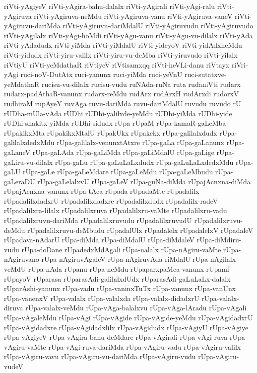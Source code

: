 {riVti-yAgiyeV
riVti-yAgira-bahu-dalalx
riVti-yAgirali
riVti-yAgi-ralu
riVti-yAgiruva
riVti-yAgiruva-neMdu
riVti-yAgiruva-vanu
riVti-yAgiruva-vaneV
riVti-yAgiruvu-dariMda
riVti-yAgiruvu-dariMdalU
riVti-yAgiruvudu
riVti-yAgiruvudo
riVti-yAgilalx
riVti-yAgi-hoMdi
riVti-yAgu-vanu
riVti-yAgu-vu-dilalx
riVti-yAda
riVti-yAdadudx
riVti-yiMda
riVti-yiMdalU
riVti-yideyoV
riVti-yidAdxneMdu
riVti-yidudx
riVti-yiru-valilx
riVti-yiru-vu-deMba
riVti-yiruvudo
riVti-yilalx
riVtiyU
riVti-yeMdathaR
riVtiyeV
riVtisamxqq
riVti-heVLi-danu
riVtayx
riVri-yAgi
ruci-noV-DutAtx
ruci-yanunx
ruci-yiMda
ruci-yeVnU
ruci-sutatxve-yeMdathaR
rucisu-vu-dilalx
rucisu-vudu
ruNAda-ruNa
ruta
rudaniVti
rudarx
rudarx-padAthaR-vanunx
rudarx-reMdu
rudArx
rudArxH
rudArxdi
rudorxV
rudhiraM
rupAyeY
ruvAga
ruvu-dariMda
ruvu-dariMdalU
ruvudu
ruvudo
rU
rUDha-mUla-vAda
rUDhi
rUDhi-yalilxde-yeMdu
rUDhi-yiMda
rUDhi-yide
rUDhi-shakitx-yiMda
rUDhi-sidudx
rUpa
rUpaM
rUpa-kamaR-gaLeMba
rUpakikxMta
rUpakikxMtalU
rUpakUkx
rUpakekx
rUpa-galilalxdudx
rUpa-galilalxdedxMdu
rUpa-galilalx-venunxtAtxre
rUpa-gaLa
rUpa-gaLanunx
rUpa-gaLaneV
rUpa-gaLAda
rUpa-gaLiMda
rUpa-gaLiMdalU
rUpa-gaLige
rUpa-gaLiru-vu-dilalx
rUpa-gaLu
rUpa-gaLuLaLxdudx
rUpa-gaLuLaLxdedxMdu
rUpa-gaLU
rUpa-gaLe
rUpa-gaLeMdare
rUpa-gaLeMdu
rUpa-gaLeMbudu
rUpa-gaLeraDU
rUpa-gaLelalxvU
rUpa-gaLeV
rUpa-guNa-diMda
rUpajAcnxna-diMda
rUpajAcnxna-vanunx
rUpa-tAca
rUpada
rUpadaMte
rUpadalilx
rUpadalilxdadxrU
rUpadalilxdadxre
rUpadalilxdudx
rUpadalilx-radeV
rUpadalilxra-lilalx
rUpadalilxruva
rUpadalilxru-vaMte
rUpadalilxru-vadu
rUpadalilxruvu-dariMda
rUpadalilxruvudu
rUpadalilxruvudU
rUpadalilxruvu-deMdu
rUpadalilxruvu-deMbudu
rUpadalUlx
rUpadalelx
rUpadalelxV
rUpadaleV
rUpadava-nAdarU
rUpa-diMda
rUpa-diMdalU
rUpa-diMdaleV
rUpa-diMdiru-vudu
rUpa-doDane
rUpadedxMdAgali
rUpa-nalalx
rUpa-nAgiru-vaMte
rUpa-nAgiruvano
rUpa-nAgiruvAgaleV
rUpa-nAgiruvAda-riMdalU
rUpa-nAgilalx-veMdU
rUpa-nAda
rUpanu
rUpa-neMdu
rUpaparxpaMca-vanunx
rUpamf
rUpayoV
rUparasa
rUparasAdi-galilalxdUdx
rUparasAdi-gaLuLaLx-dalalx
rUparAshi-yanunx
rUpa-vadu
rUpa-vaninxTuTx
rUpa-vanunx
rUpa-vanUnx
rUpa-vanenxV
rUpa-valalx
rUpa-valalxda
rUpa-valalx-didadxrU
rUpa-valalx-diruva
rUpa-valalx-veMdu
rUpa-vAga-balalxvu
rUpa-vAga-lAradu
rUpa-vAgali
rUpa-vAgaleMdu
rUpa-vAgi
rUpa-vAgide
rUpa-vAgide-yeMdu
rUpa-vAgidadxrU
rUpa-vAgidadxre
rUpa-vAgidadxlilx
rUpa-vAgidudx
rUpa-vAgiyU
rUpa-vAgiye
rUpa-vAgiyeV
rUpa-vAgira-bahu-deMdare
rUpa-vAgirali
rUpa-vAgi-ruva
rUpa-vAgiru-vaMte
rUpa-vAgi-ruva-dariMda
rUpa-vAgiru-vadu
rUpa-vAgiru-valilx
rUpa-vAgiru-vavu
rUpa-vAgiru-vu-dariMda
rUpa-vAgiru-vudu
rUpa-vAgiru-vudeV
}
